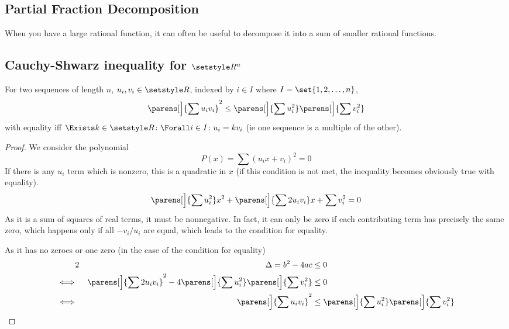 \subsection{Partial Fraction Decomposition}

When you have a large rational function, it can often be useful to decompose it
into a sum of smaller rational functions.

\subsection[Cauchy-Shwarz inequality for
            \texorpdfstring{\(\Reals^n\)}{sequences of real numbers}]
           {Cauchy-Shwarz inequality for \boldmath\(\Reals^n\)}

\begin{theorem}
 For two sequences of length \(n\), \(u_i, v_i \in \Reals\), indexed by
 \(i \in I\) where \(I = \set{1, 2, \dotsc, n}\),
 \begin{equation*}
  \parens[\Big]{\sum u_i v_i}^2 \le
      \parens[\Big]{\sum u_i^2} \parens[\Big]{\sum v_i^2}
 \end{equation*}
 with equality iff
 \(\Exists k \in \Reals \colon \Forall i \in I \colon u_i = k v_i\)
 (ie one sequence is a multiple of the other).
\end{theorem}
\begin{proof}
    We consider the polynomial
    \begin{equation*}
    P(x) = \sum (u_i x + v_i)^2 = 0
    \end{equation*}
    If there is any \(u_i\) term which is nonzero, this is a quadratic in \(x\)
    (if this condition is not met, the inequality becomes obviously true with
    equality).
    \begin{equation*}
     \parens[\Big]{\sum u_i^2} x^2 +
     \parens[\Big]{\sum 2 u_i v_i} x + \sum v_i^2 = 0
    \end{equation*}
    As it is a sum of squares of real terms, it must be nonnegative. In fact, it
    can only be zero if each contributing term has precisely the same zero,
    which happens only if all \(-v_i/u_i\) are equal, which leads to the
    condition for equality.

    As it has no zeroes or one zero (in the case of the condition for equality)
    \begin{alignat*}2
     &&\Delta = b^2 - 4ac &\le 0 \\
     \iff{}&&
     \parens[\Big]{\sum 2 u_i v_i}^2 -
                4\parens[\Big]{\sum u_i^2}\parens[\Big]{\sum v_i^2} &\le 0 \\
     \iff{}&& \parens[\Big]{\sum u_i v_i}^2
         &\le \parens[\Big]{\sum u_i^2} \parens[\Big]{\sum v_i^2} \qedhere
    \end{alignat*}
\end{proof}

